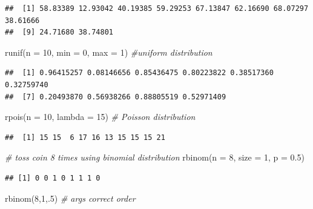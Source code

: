 \documentclass[
]{book}
\newenvironment{Shaded}{\begin{snugshade}}{\end{snugshade}}
\newcommand{\AttributeTok}[1]{\textcolor[rgb]{0.77,0.63,0.00}{#1}}
\newcommand{\CommentTok}[1]{\textcolor[rgb]{0.56,0.35,0.01}{\textit{#1}}}
\newcommand{\DecValTok}[1]{\textcolor[rgb]{0.00,0.00,0.81}{#1}}
\newcommand{\FloatTok}[1]{\textcolor[rgb]{0.00,0.00,0.81}{#1}}
\newcommand{\FunctionTok}[1]{\textcolor[rgb]{0.00,0.00,0.00}{#1}}
\newcommand{\NormalTok}[1]{#1}
\theoremstyle{definition}
\theoremstyle{definition}
\theoremstyle{definition}
\theoremstyle{definition}
\theoremstyle{remark}
\begin{document}
\begin{verbatim}
##  [1] 58.83389 12.93042 40.19385 59.29253 67.13847 62.16690 68.07297 38.61666
##  [9] 24.71680 38.74801
\end{verbatim}

\begin{Shaded}
\begin{Highlighting}[]
\FunctionTok{runif}\NormalTok{(}\AttributeTok{n =} \DecValTok{10}\NormalTok{, }\AttributeTok{min =} \DecValTok{0}\NormalTok{, }\AttributeTok{max =} \DecValTok{1}\NormalTok{) }\CommentTok{\#uniform distribution}
\end{Highlighting}
\end{Shaded}

\begin{verbatim}
##  [1] 0.96415257 0.08146656 0.85436475 0.80223822 0.38517360 0.32759740
##  [7] 0.20493870 0.56938266 0.88805519 0.52971409
\end{verbatim}

\begin{Shaded}
\begin{Highlighting}[]
\FunctionTok{rpois}\NormalTok{(}\AttributeTok{n =} \DecValTok{10}\NormalTok{, }\AttributeTok{lambda =} \DecValTok{15}\NormalTok{) }\CommentTok{\# Poisson distribution}
\end{Highlighting}
\end{Shaded}

\begin{verbatim}
##  [1] 15 15  6 17 16 13 15 15 15 21
\end{verbatim}

\begin{Shaded}
\begin{Highlighting}[]
\CommentTok{\# toss coin 8 times using binomial distribution}
\FunctionTok{rbinom}\NormalTok{(}\AttributeTok{n =} \DecValTok{8}\NormalTok{, }\AttributeTok{size =} \DecValTok{1}\NormalTok{, }\AttributeTok{p =} \FloatTok{0.5}\NormalTok{)}
\end{Highlighting}
\end{Shaded}

\begin{verbatim}
## [1] 0 0 1 0 1 1 1 0
\end{verbatim}

\begin{Shaded}
\begin{Highlighting}[]
\FunctionTok{rbinom}\NormalTok{(}\DecValTok{8}\NormalTok{,}\DecValTok{1}\NormalTok{,.}\DecValTok{5}\NormalTok{) }\CommentTok{\# args correct order}
\end{Highlighting}
\end{Shaded}
\end{document}
